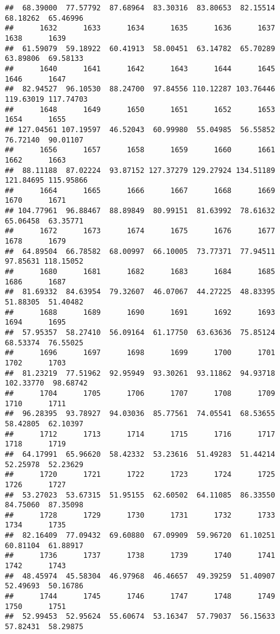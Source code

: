 \documentclass[
]{article}
\begin{document}
\begin{verbatim}
##  68.39000  77.57792  87.68964  83.30316  83.80653  82.15514  68.18262  65.46996 
##      1632      1633      1634      1635      1636      1637      1638      1639 
##  61.59079  59.18922  60.41913  58.00451  63.14782  65.70289  63.89806  69.58133 
##      1640      1641      1642      1643      1644      1645      1646      1647 
##  82.94527  96.10530  88.24700  97.84556 110.12287 103.76446 119.63019 117.74703 
##      1648      1649      1650      1651      1652      1653      1654      1655 
## 127.04561 107.19597  46.52043  60.99980  55.04985  56.55852  76.72140  90.01107 
##      1656      1657      1658      1659      1660      1661      1662      1663 
##  88.11188  87.02224  93.87152 127.37279 129.27924 134.51189 121.84695 115.95866 
##      1664      1665      1666      1667      1668      1669      1670      1671 
## 104.77961  96.88467  88.89849  80.99151  81.63992  78.61632  65.06458  63.35771 
##      1672      1673      1674      1675      1676      1677      1678      1679 
##  64.89504  66.78582  68.00997  66.10005  73.77371  77.94511  97.85631 118.15052 
##      1680      1681      1682      1683      1684      1685      1686      1687 
##  81.69332  84.63954  79.32607  46.07067  44.27225  48.83395  51.88305  51.40482 
##      1688      1689      1690      1691      1692      1693      1694      1695 
##  57.95357  58.27410  56.09164  61.17750  63.63636  75.85124  68.53374  76.55025 
##      1696      1697      1698      1699      1700      1701      1702      1703 
##  81.23219  77.51962  92.95949  93.30261  93.11862  94.93718 102.33770  98.68742 
##      1704      1705      1706      1707      1708      1709      1710      1711 
##  96.28395  93.78927  94.03036  85.77561  74.05541  68.53655  58.42805  62.10397 
##      1712      1713      1714      1715      1716      1717      1718      1719 
##  64.17991  65.96620  58.42332  53.23616  51.49283  51.44214  52.25978  52.23629 
##      1720      1721      1722      1723      1724      1725      1726      1727 
##  53.27023  53.67315  51.95155  62.60502  64.11085  86.33550  84.75060  87.35098 
##      1728      1729      1730      1731      1732      1733      1734      1735 
##  82.16409  77.09432  69.60880  67.09909  59.96720  61.10251  60.81104  61.88917 
##      1736      1737      1738      1739      1740      1741      1742      1743 
##  48.45974  45.58304  46.97968  46.46657  49.39259  51.40907  52.49693  50.16786 
##      1744      1745      1746      1747      1748      1749      1750      1751 
##  52.99453  52.95624  55.60674  53.16347  57.79037  56.15633  57.82431  58.29875 

\end{verbatim}
\end{document}
